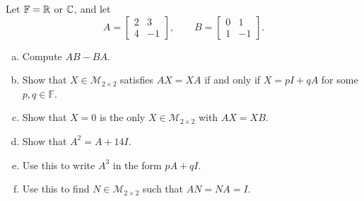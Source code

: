 \begin{exercise}
  \label{ex:hw02:two-by-two-matrix-identities}
  Let \(\mathbb F=\mathbb{R}\) or \(\mathbb{C}\), and let
  \[
    A=\begin{bmatrix}2&3\\4&-1\end{bmatrix},\qquad
    B=\begin{bmatrix}0&1\\1&-1\end{bmatrix}.
  \]
  \begin{enumerate}[(a)][2]
    \item Compute \(AB-BA\).
    \item Show that \(X\in\mathcal M_{2\times2}\) satisfies \(AX=XA\)
      if and only if \(X=pI+qA\) for some \(p,q\in\mathbb F\).
    \item Show that \(X=0\) is the only \(X\in\mathcal M_{2\times2}\)
      with \(AX=XB\).
    \item Show that \(A^2=A+14I\).
    \item Use this to write \(A^3\) in the form \(pA+qI\).
    \item Use this to find \(N\in\mathcal M_{2\times2}\) such that
      \(AN=NA=I\).
  \end{enumerate}
\end{exercise}
